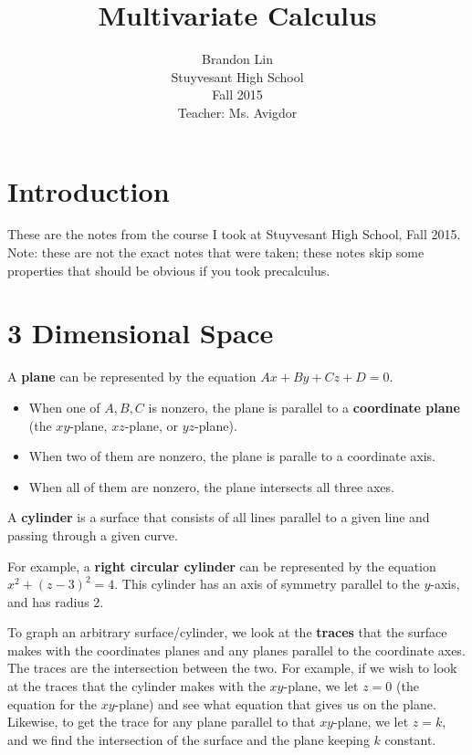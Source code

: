 \documentclass[12pt]{article}
\begin{document}
\title{Multivariate Calculus}
\author{Brandon Lin\\Stuyvesant High School\\Fall 2015\\Teacher: Ms. Avigdor}
\maketitle
\newpage
\section*{Introduction}
These are the notes from the course I took at Stuyvesant High School, Fall 2015. Note: these are not the exact notes that were taken; these notes skip some properties that should be obvious if you took precalculus.
\section{3 Dimensional Space}
A \textbf{plane} can be represented by the equation $Ax + By + Cz + D = 0$. 
\begin{itemize}
\item When one of $A,B,C$ is nonzero, the plane is parallel to a \textbf{coordinate plane} (the $xy$-plane, $xz$-plane, or $yz$-plane).
\item When two of them are nonzero, the plane is paralle to a coordinate axis.
\item When all of them are nonzero, the plane intersects all three axes.
\end{itemize}

A \textbf{cylinder} is a surface that consists of all lines parallel to a given line and passing through a given curve. 

For example, a \textbf{right circular cylinder} can be represented by the equation $x^2 + (z-3)^2 = 4$. This cylinder has an axis of symmetry parallel to the $y$-axis, and has radius 2.

To graph an arbitrary surface/cylinder, we look at the \textbf{traces} that the surface makes with the coordinates planes and any planes parallel to the coordinate axes. The traces are the intersection between the two. For example, if we wish to look at the traces that the cylinder makes with the $xy$-plane, we let $z=0$ (the equation for the $xy$-plane) and see what equation that gives us on the plane. Likewise, to get the trace for any plane parallel to that $xy$-plane, we let $z=k$, and we find the intersection of the surface and the plane keeping $k$ constant.
\end{document}
